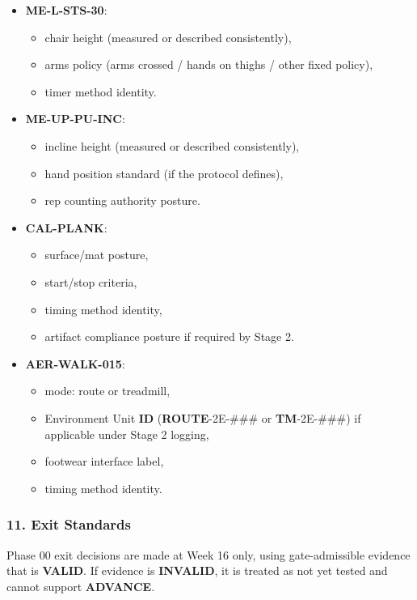 \documentclass[10pt]{article}
\begin{document}
\begin{itemize}
\item \textbf{ME-L-STS-30}:
  \begin{itemize}
  \item chair height (measured or described consistently),
  \item arms policy (arms crossed / hands on thighs / other fixed policy),
  \item timer method identity.
  \end{itemize}

\item \textbf{ME-UP-PU-INC}:
  \begin{itemize}
  \item incline height (measured or described consistently),
  \item hand position standard (if the protocol defines),
  \item rep counting authority posture.
  \end{itemize}

\item \textbf{CAL-PLANK}:
  \begin{itemize}
  \item surface/mat posture,
  \item start/stop criteria,
  \item timing method identity,
  \item artifact compliance posture if required by Stage 2.
  \end{itemize}

\item \textbf{AER-WALK-015}:
  \begin{itemize}
  \item mode: route or treadmill,
  \item Environment Unit \textbf{ID} (\textbf{ROUTE}-2E-### or \textbf{TM}-2E-###) if applicable under Stage 2 logging,
  \item footwear interface label,
  \item timing method identity.
  \end{itemize}
\end{itemize}

\subsubsection*{11. Exit Standards}

Phase 00 exit decisions are made at Week 16 only, using gate-admissible evidence that is \textbf{VALID}. If evidence is \textbf{INVALID}, it is treated as not yet tested and cannot support \textbf{ADVANCE}.
\end{document}
